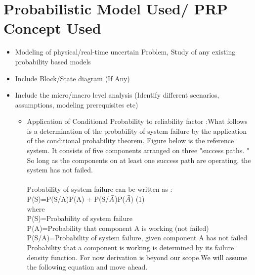 \documentclass{article}
\begin{document}
\section {Probabilistic Model Used/ PRP Concept Used}
\begin{itemize}

\item Modeling of physical/real-time uncertain Problem, Study of any existing probability based models
\item Include Block/State diagram (If Any)
\item Include the micro/macro level analysis (Identify different scenarios, assumptions, modeling prerequisites etc)
 \begin{itemize}
     \item Application of Conditional Probability to reliability factor :What
follows is a determination of the probability of system failure by the
application of the conditional probability theorem. Figure below is the reference system. It consists of five components arranged on three "success paths. " So long as the components on at least one success path are operating, the system has not failed.\\ \\
    Probability of system failure can be written as : \\\vspace{10mm}
    \hspace{50mm}P(S)=P(S/A)P(A) + P(S/$\Bar{A}$)P($\Bar{A}$)\hspace{30mm} (1)\\
    where\\\vspace{2mm}
    \hspace{15mm}P(S)=Probability of system failure\\\vspace{2mm}
    \hspace{15mm}P(A)=Probability that component A is working (not failed)\\\vspace{2mm}
    \hspace{15mm}P(S/A)=Probability of system failure, given component A has not failed\\\vspace{2mm}
    Probability that a component is working is determined by its failure density function. For now derivation is beyond our scope.We will assume the following equation and move ahead. 

\end{itemize}
\end{itemize}
\end{document}
